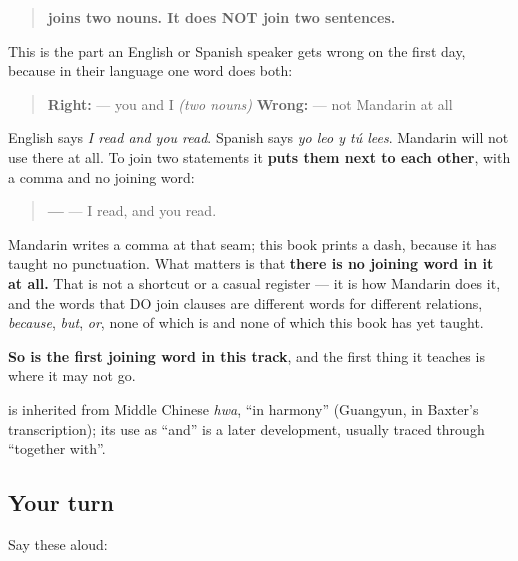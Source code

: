 \begin{grammarlens}[title={Grammar Lens: it joins nouns, and only nouns}]
\begin{quote}
\textbf{ joins two nouns. It does NOT join two sentences.}
\end{quote}

This is the part an English or Spanish speaker gets wrong on the first day, because in their language one word does both:

\begin{quote}
\textbf{Right:} \textbf{} — you and I \emph{(two nouns)} \textbf{Wrong:} \emph{} — not Mandarin at all
\end{quote}

English says \emph{I read and you read}. Spanish says \emph{yo leo y tú lees}. Mandarin will not use  there at all. To join two statements it \textbf{puts them next to each other}, with a comma and no joining word:

\begin{quote}
\textbf{ — } — I read, and you read.
\end{quote}

Mandarin writes a comma at that seam; this book prints a dash, because it has taught no punctuation. What matters is that \textbf{there is no joining word in it at all.} That is not a shortcut or a casual register — it is how Mandarin does it, and the words that DO join clauses are different words for different relations, \emph{because}, \emph{but}, \emph{or}, none of which is  and none of which this book has yet taught.

\textbf{So  is the first joining word in this track}, and the first thing it teaches is where it may not go.
\end{grammarlens}

\begin{cousinweb}
\textbf{} is inherited from Middle Chinese \emph{hwa}, \textquotedblleft{}in harmony\textquotedblright{} (Guangyun, in Baxter's transcription); its use as \textquotedblleft{}and\textquotedblright{} is a later development, usually traced through \textquotedblleft{}together with\textquotedblright{}.
\end{cousinweb}

\subsection*{Your turn}
Say these aloud:

